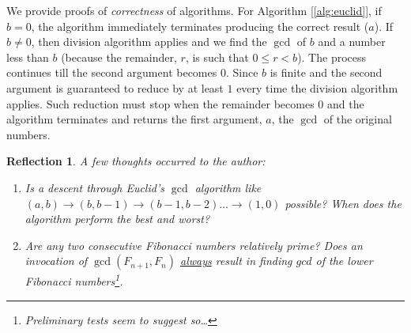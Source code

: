 \documentclass[english,notitlepage,smartquotes]{hgbreport}
\theoremstyle{definition}
\theoremstyle{remark}
\theoremstyle{plain}
\newtheorem{reflection}{Reflection}
\begin{document}
We provide proofs of \emph{correctness} of algorithms. For Algorithm [\ref{alg:euclid}], if $b=0$, the algorithm immediately terminates producing the correct result ($a$). If $b\ne 0$, then division algorithm applies and we find the $\gcd$ of $b$ and a number less than $b$ (because the remainder, $r$, is such that $0\leq r<b$). The process continues till the second argument becomes $0$. Since $b$ is finite and the second argument is guaranteed to reduce by at least $1$ every time the division algorithm applies. Such reduction must stop when the remainder becomes $0$ and the algorithm terminates and returns the first argument, $a$, the $\gcd$ of the original numbers. 

\begin{reflection}
A few thoughts occurred to the author:
\begin{enumerate}
\item Is a \emph{descent} through Euclid's $\gcd$ algorithm like $(a,b)\rightarrow(b,b-1)\rightarrow(b-1,b-2)\dots\rightarrow(1,0)$ possible? When does the algorithm perform the best and worst?
\item Are any two consecutive Fibonacci numbers relatively prime? Does an invocation of $\gcd(F_{n+1}, F_n)$ \underline{always} result in finding $gcd$ of the lower Fibonacci numbers\footnote{\emph{Preliminary} tests seem to suggest so\dots}.
\end{enumerate}
\end{reflection}
\end{document}

